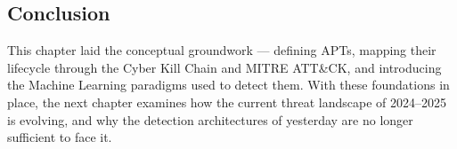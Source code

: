 \subsection{Conclusion}
This chapter laid the conceptual groundwork — defining APTs, mapping their lifecycle
through the Cyber Kill Chain and MITRE ATT\&CK, and introducing the Machine Learning
paradigms used to detect them. With these foundations in place, the next chapter examines
how the current threat landscape of 2024--2025 is evolving, and why the detection
architectures of yesterday are no longer sufficient to face it.



